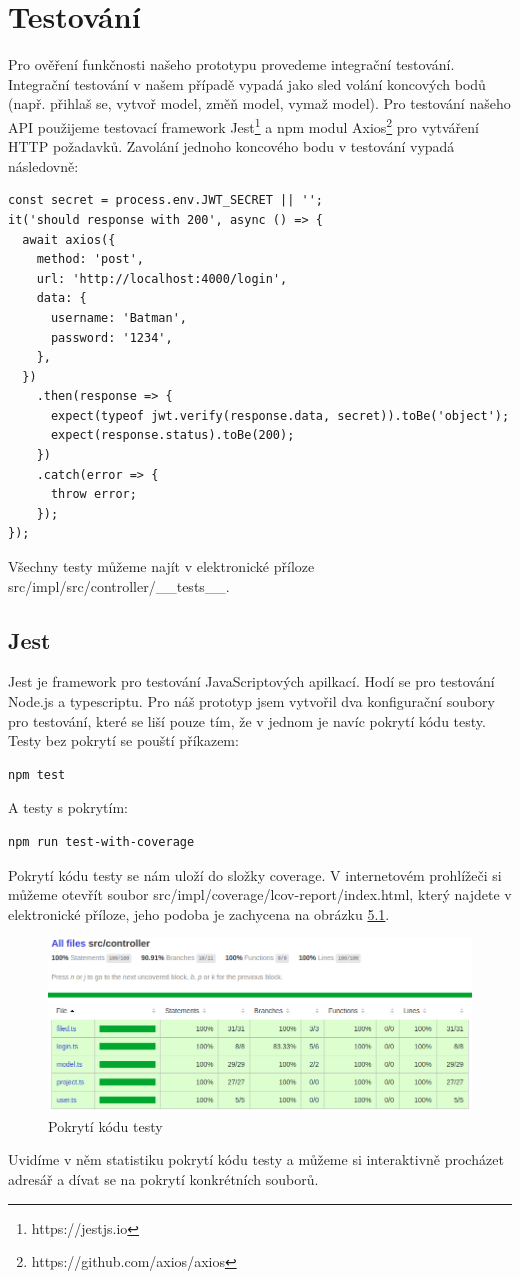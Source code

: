 \documentclass[thesis=B,czech]{FITthesis}[2012/06/26]
\begin{document}
\chapter{Testování}
    Pro ověření funkčnosti našeho prototypu provedeme integrační testování. Integrační testování v našem případě vypadá jako sled volání koncových bodů (např. přihlaš se, vytvoř model, změň model, vymaž model). Pro testování našeho API použijeme testovací framework Jest\footnote{https://jestjs.io} a npm modul Axios\footnote{https://github.com/axios/axios} pro vytváření HTTP požadavků. Zavolání jednoho koncového bodu v testování vypadá následovně:
    \begin{verbatim}
const secret = process.env.JWT_SECRET || '';
it('should response with 200', async () => {
  await axios({
    method: 'post',
    url: 'http://localhost:4000/login',
    data: {
      username: 'Batman',
      password: '1234',
    },
  })
    .then(response => {
      expect(typeof jwt.verify(response.data, secret)).toBe('object');
      expect(response.status).toBe(200);
    })
    .catch(error => {
      throw error;
    });
});
    \end{verbatim}

    Všechny testy můžeme najít v elektronické příloze src/impl/src/controller/\_\_tests\_\_.

    \section{Jest}
        Jest je framework pro testování JavaScriptových apilkací. Hodí se pro testování Node.js a typescriptu.
        Pro náš prototyp jsem vytvořil dva konfigurační soubory pro testování, které se liší pouze tím, že v jednom je navíc pokrytí kódu testy. Testy bez pokrytí se pouští příkazem:
            \begin{verbatim}
npm test
            \end{verbatim}
        A testy s pokrytím:
            \begin{verbatim}
npm run test-with-coverage
            \end{verbatim}
        Pokrytí kódu testy se nám uloží do složky coverage. V internetovém prohlížeči si můžeme otevřít soubor
        src/impl/coverage/lcov-report/index.html, který najdete v elektronické příloze, jeho podoba je zachycena na obrázku \hyperref[coverage]{5.1}.
        \begin{figure}[h!] \label{coverage}
            \includegraphics[width=\linewidth]{coverage}
            \caption{Pokrytí kódu testy}
        \end{figure}
        Uvidíme v něm statistiku pokrytí kódu testy a můžeme si interaktivně procházet adresář a dívat se na pokrytí konkrétních souborů.
\end{document}
